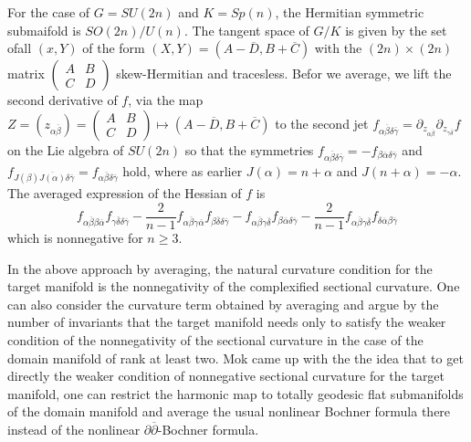 For the case of $G=SU(2n)$ and $K =Sp(n)$, the Hermitian symmetric submaifold is $SO(2n)/U(n)$. The tangent space of $G/K$ is given by the set of\pageoriginale all $(x, Y)$ of the form $(X, Y)= (A-\overline{D}, B + \overline{C})$ with the $(2n) \times (2n)$ matrix $\begin{pmatrix}
A  & B\\
C & D
\end{pmatrix}$ skew-Hermitian and tracesless. Befor we average, we lift the second derivative of $f$, via the map $Z=(z_{\alpha \overline{\beta}})= \begin{pmatrix}
A  & B\\
C & D
\end{pmatrix}
\mapsto (A- \overline{D}, B + \overline{C})$ to the second jet $f_{\alpha \overline{\beta}\delta \overline{\gamma}} =\partial_{z_{\alpha \overline{\beta}}} \partial_{z_{\gamma \overline{\delta}}}f$ on the Lie algebra of $SU(2n)$ so that the symmetries $f_{\alpha \overline{\beta}\delta\overline{\gamma}} = -f_{\beta \overline{\alpha}\delta \overline{\gamma}}$ and $f_{J(\beta)\overline{J(\alpha)}\delta\overline{\gamma}} =f_{\alpha \overline{\beta}\delta \overline{\gamma}}$ hold, where as earlier $J (\alpha) =n + \alpha$ and $J(n + \alpha)= -\alpha$. The averaged expression of the Hessian of $f$ is
$$
f_{\alpha \overline{\beta}\beta\overline{\alpha}}f_{\gamma \overline{\delta}\delta \overline{\gamma}} - \dfrac{2}{n-1}f_{\alpha\overline{\beta}\gamma \overline{\alpha}}f_{\beta\overline{\delta}\delta \overline{\gamma}} - f_{\alpha \overline{\beta}\gamma \overline{\delta}}f_{\beta \overline{\alpha}\delta \overline{\gamma}} -\dfrac{2}{n-1} f_{\alpha \overline{\beta}\gamma \overline{\delta}}f_{\delta \overline{\alpha}\beta \overline{\gamma}}
$$
which is nonnegative for $n \geq 3$.

In the above approach by averaging, the natural curvature condition for the target manifold is the nonnegativity of  the complexified sectional curvature. One can also consider the curvature term obtained by averaging and argue by the number of invariants that the target manifold needs only to satisfy the weaker condition of the nonnegativity of the sectional curvature in the case of the domain manifold of rank at least two. Mok came up with the the idea that to get directly the weaker condition of nonnegative sectional curvature for the target manifold, one can restrict the harmonic map to totally geodesic flat submanifolds of the domain manifold and average the usual nonlinear Bochner formula there instead of the nonlinear $\partial \overline{\partial}$-Bochner formula.

